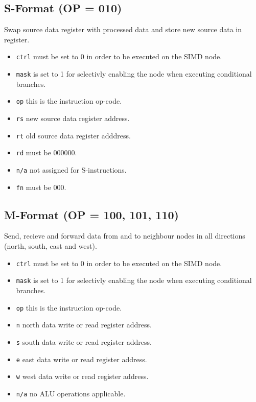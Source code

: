 \subsection{S-Format (OP = 010)}
Swap source data register with processed data and store new source data in
register.



\begin{itemize}
\item {\tt ctrl}  must be set to 0 in order to be executed on the SIMD node.
\item {\tt mask} is set to 1 for selectivly enabling the node when executing
  conditional branches.
\item {\tt op}   this is the instruction op-code.
\item {\tt rs}   new source data register address.
\item {\tt rt}   old source data register adddress.
\item {\tt rd}   must be 000000.
\item {\tt n/a}  not assigned for S-instructions.
\item {\tt fn}   must be 000.
\end{itemize}



\subsection{M-Format (OP = 100, 101, 110)}
Send, recieve and forward data from and to neighbour nodes in all directions (north, south, east and west).



\begin{itemize}
\item {\tt ctrl} must be set to 0 in order to be executed on the SIMD node.
\item {\tt mask} is set to 1 for selectivly enabling the node when executing
  conditional branches.
\item {\tt op} this is the instruction op-code.
\item {\tt n} north data write or read register address.
\item {\tt s} south data write or read register address.
\item {\tt e} east data write or read register address.
\item {\tt w} west data write or read register address.
\item {\tt n/a} no ALU operations applicable.
\end{itemize}

